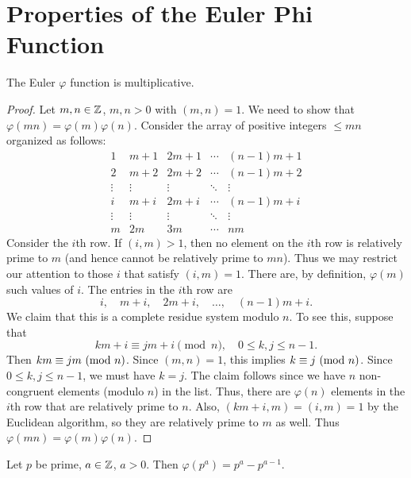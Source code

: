 \section{Properties of the Euler Phi Function}

\begin{theorem}
  The Euler $\varphi$ function is
  multiplicative.
\end{theorem}

\begin{proof}
  Let $m, n \in \mathbb{Z}$, $m, n > 0$ with
  $(m, n) = 1$. We need to show that
  $\varphi(mn) = \varphi(m) \varphi(n)$.
  Consider the array of positive integers
  $\le mn$ organized as follows:
  \[
  \begin{matrix}
    1 & m + 1 & 2m + 1 & \cdots & (n - 1)m + 1 \\
    2 & m + 2 & 2m + 2 & \cdots & (n - 1)m + 2 \\
    \vdots & \vdots & \vdots & \ddots & \vdots \\
    i & m + i & 2m + i & \cdots & (n - 1)m + i \\
    \vdots & \vdots & \vdots & \ddots & \vdots \\
    m & 2m & 3m & \cdots & nm
  \end{matrix}
  \]
  Consider the $i$th row. If $(i, m) > 1$,
  then no element on the $i$th row is
  relatively prime to $m$ (and hence
  cannot be relatively prime to $mn$). Thus
  we may restrict our attention to those
  $i$ that satisfy $(i, m) = 1$. There
  are, by definition, $\varphi(m)$
  such values of $i$. The entries in the
  $i$th row are
  \[
    i, \quad m + i, \quad 2m + i, \quad \dots, \quad (n - 1)m + i.
  \]
  We claim that this is a complete
  residue system modulo $n$. To see this,
  suppose that
  \[
    km + i \equiv jm + i \pmod{n},
    \quad 0 \le k, j \le n - 1.
  \]
  Then $km \equiv jm \ (\mathrm{mod}\ n)$. Since
  $(m, n) = 1$, this implies
  $k \equiv j \ (\mathrm{mod}\ n)$. Since
  $0 \le k, j \le n - 1$, we must have
  $k = j$. The claim follows since
  we have $n$ non-congruent elements
  (modulo $n$)
  in the list. Thus, there are
  $\varphi(n)$ elements in the $i$th row
  that are relatively prime to $n$. Also,
  $(km + i, m) = (i, m) = 1$
  by the Euclidean algorithm, so
  they are relatively prime to $m$ as well. Thus
  $\varphi(mn) = \varphi(m) \varphi(n)$.
\end{proof}

\begin{theorem}
  Let $p$ be prime, $a \in \mathbb{Z}$, $a > 0$.
  Then $\varphi(p^a) = p^a - p^{a - 1}$.
\end{theorem}


